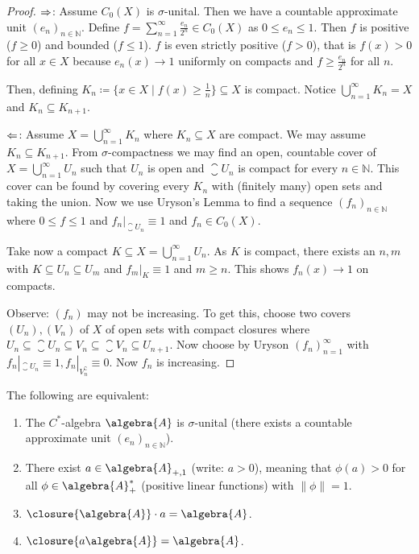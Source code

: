 \documentclass[a4paper]{article}
\begin{document}
\begin{proof}
	$\Rightarrow$: Assume $C_0(X)$ is $\sigma$-unital. 
	Then we have a countable approximate unit $(e_n)_{n \in \mathds{N}}$.
	Define $f = \sum_{n = 1}^{\infty}  \frac{e_n}{2^n} \in C_0(X)$ as $0 \leq e_n \leq 1$.
	Then $f$ is positive ($f \geq 0$) and bounded ($f \leq 1$).
	$f$ is even strictly positive ($f > 0$), that is $f(x) > 0$ for all $x \in X$ because $e_n(x) \to 1$ uniformly on compacts and $f \geq \frac{e_n}{2^n}$ for all $n$.

	Then, defining $K_n \coloneq \{x \in X \mid f(x) \geq \frac{1}{n} \} \subseteq X$ is compact.
	Notice $\bigcup_{n =1 }^\infty K_n = X$ and $K_n \subseteq K_{n+1}$.
	
	$\Leftarrow$: Assume $X = \bigcup_{n = 1}^\infty K_n$ where $K_n \subseteq X$ are compact.
	We may assume $K_n \subseteq K_{n+1}$.
	From $\sigma$-compactness we may find an open, countable cover of $X = \bigcup_{n = 1}^{\infty} U_n$ such that $U_n$ is open and $\closure{U_n}$ is compact for every $n \in \mathds{N}$.
	This cover can be found by covering every $K_n$ with (finitely many) open sets and taking the union.
	Now we use Uryson's Lemma to find a sequence $(f_n)_{n \in \mathds{N}}$ where $0 \leq f \leq 1$ and $f_n|_{\closure{U}_n} \equiv 1$ and $f_n \in C_0(X)$.

	Take now a compact $K \subseteq X = \bigcup_{n = 1}^\infty U_n$.
	As $K$ is compact, there exists an $n, m$ with $K \subseteq U_n \subseteq U_m$ and $f_m |_K \equiv 1$ and $m \geq n$.
	This shows $f_n(x) \to 1$ on compacts.

	Observe: $(f_n)$ may not be increasing.
	To get this, choose two covers $(U_n), (V_n)$ of $X$ of open sets with compact closures where $U_n \subseteq \closure{U_n} \subseteq V_n \subseteq \closure{V_n} \subseteq U_{n+1}$.
	Now choose by Uryson $(f_n)_{n=1}^\infty$ with $f_n|_{\closure{U_n}} \equiv 1, f_n|_{V_n^\complement} \equiv 0$.
	Now $f_n$ is increasing.
\end{proof}

\begin{remark}
	The following are equivalent:
	\begin{enumerate}
		\item The $C^*$-algebra $\algebra{A}$ is $\sigma$-unital (there exists a countable approximate unit $(e_n)_{n \in \mathds{N}}$).
		\item There exist $a \in \algebra{A}_{+, 1}$ (write: $a > 0$), meaning that $\phi(a) > 0$ for all $\phi \in \algebra{A}_+^*$ (positive linear functions) with $\|\phi\| = 1$.
		\item $\closure{\algebra{A}} \cdot a = \algebra{A}$.
		\item $\closure{a \algebra{A}} = \algebra{A}$.
	\end{enumerate}
\end{remark}
\end{document}
